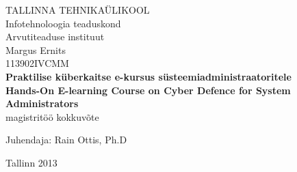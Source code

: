 \documentclass[12pt,a4paper,oneside]{article}
\begin{document}
\clearpage
\begin{titlepage}

	\begingroup
		\singlespace
		\begin{center}
			TALLINNA TEHNIKAÜLIKOOL \\
			Infotehnoloogia teaduskond \\
			Arvutiteaduse instituut \\
			
		
			\vfill
				Margus Ernits \\
				113902IVCMM \\[1.5cm]
				\LARGE \textbf{Praktilise küberkaitse e-kursus süsteemiadministraatoritele} \\[1cm]
				\LARGE \textbf{Hands-On E-learning Course on Cyber Defence for System Administrators} \\[1cm]
				\normalsize magistritöö kokkuvõte \\[4cm]

				\begin{flushright}
					Juhendaja: Rain Ottis, Ph.D \\
					
				\end{flushright}
			\vfill

			Tallinn 2013
		\end{center}
	\endgroup
\thispagestyle{empty}
\end{titlepage}
%
%
%



\printglossaries
%
%
%
%
%
%

%


%




%

%
\end{document}
